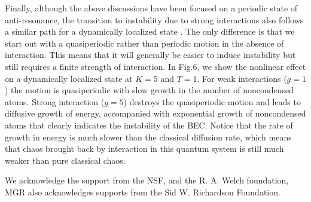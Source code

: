 \documentclass[twocolumn,prl,aps,showpacs]{revtex4}
\begin{document}
Finally, although the above discussions have been focused on a periodic state 
of anti-resonance, the transition to instability due to strong interactions also follows a
 similar path for a dynamically localized state \cite{detail}.  The only difference is that we start out with a quasiperiodic
 rather than periodic motion in the absence of interaction.  This means that it will generally be easier to induce 
instability but still requires a finite strength of interaction.  In Fig.6, we show the nonlinear effect on a 
dynamically localized state at $K=5$ and $T=1$.     
For weak interactions ($g=1$) the motion is quasiperiodic with slow growth in the number of 
noncondensed atoms.  Strong interaction ($g=5$) destroys the quasiperiodic motion and leads to diffusive growth of energy, 
accompanied with exponential growth of noncondensed atoms that clearly indicates the instability of the BEC. 
Notice that the rate of growth in energy is much 
slower than the classical diffusion rate, which means that chaos brought back by 
interaction in this quantum system is still much weaker than pure classical chaos. 

We acknowledge the support from the NSF, and the R. A. Welch foundation, MGR
also acknowledges supports from the Sid W. Richardson Foundation.
\end{document}
